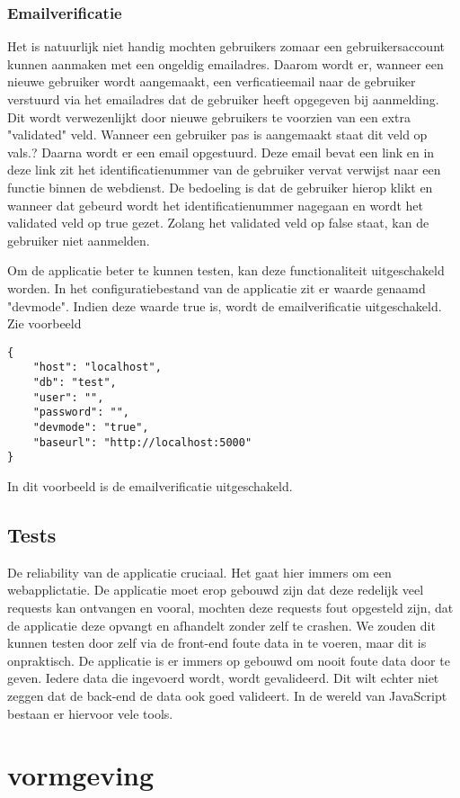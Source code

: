 \documentclass[a4paper,11pt]{article}
\begin{document}
\subsubsection{Emailverificatie}
Het is natuurlijk niet handig mochten gebruikers zomaar een gebruikersaccount kunnen aanmaken met een ongeldig emailadres. Daarom wordt er, wanneer een nieuwe gebruiker wordt aangemaakt, een verficatieemail naar de gebruiker verstuurd via het emailadres dat de gebruiker heeft opgegeven bij aanmelding. Dit wordt verwezenlijkt door nieuwe gebruikers te voorzien van een extra "validated" veld. Wanneer een gebruiker pas is aangemaakt staat dit veld op vals.? Daarna wordt er een email opgestuurd. Deze email bevat een link en in deze link zit het identificatienummer van de gebruiker vervat verwijst naar een functie binnen de webdienst. De bedoeling is dat de gebruiker hierop klikt en wanneer dat gebeurd wordt het identificatienummer nagegaan en wordt het validated veld op true gezet. Zolang het validated veld op false staat, kan de gebruiker niet aanmelden.

Om de applicatie beter te kunnen testen, kan deze functionaliteit uitgeschakeld worden. In het configuratiebestand van de applicatie zit er waarde genaamd "devmode". Indien deze waarde true is, wordt de emailverificatie uitgeschakeld. Zie voorbeeld
\begin{lstlisting}
{
	"host": "localhost",
	"db": "test",
	"user": "",
	"password": "",
	"devmode": "true",
	"baseurl": "http://localhost:5000"
}
\end{lstlisting}
In dit voorbeeld is de emailverificatie uitgeschakeld.

\subsection{Tests}
De reliability van de applicatie cruciaal. Het gaat hier immers om een webapplictatie. De applicatie moet erop gebouwd zijn dat deze redelijk veel requests kan ontvangen en vooral, mochten deze requests fout opgesteld zijn, dat de applicatie deze opvangt en afhandelt zonder zelf te crashen. We zouden dit kunnen testen door zelf via de front-end foute data in te voeren, maar dit is onpraktisch. De applicatie is er immers op gebouwd om nooit foute data door te geven. Iedere data die ingevoerd wordt, wordt gevalideerd. Dit wilt echter niet zeggen dat de back-end de data ook goed valideert. In de wereld van JavaScript bestaan er hiervoor vele tools.

\section{vormgeving}
\end{document}
